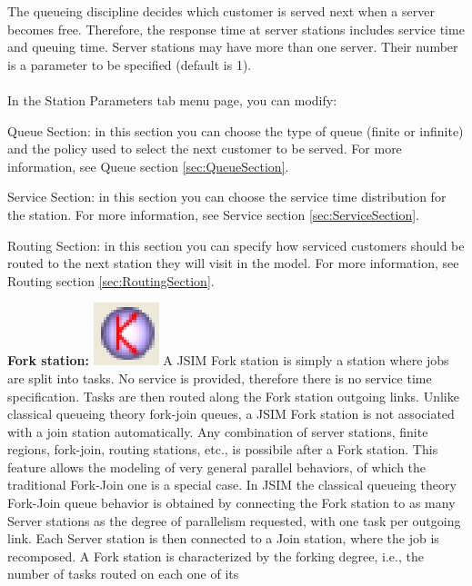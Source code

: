 \begin{enumerate*}
The queueing discipline decides which customer is served next when a server becomes free. Therefore, the response time at server stations includes service time and
queuing time. Server stations may have more than one server. Their number is a parameter to be specified (default is 1).\\\\
In the Station Parameters tab menu page, you can modify:
\begin{description*}
\item[Queue Section:]
in this section you can choose the type of queue (finite or infinite) and the policy used to select the next customer to be served.
For more information, see Queue section \autoref{sec:QueueSection}.
\item[Service Section:]
in this section you can choose the service time distribution for the station.
For more information, see Service section \autoref{sec:ServiceSection}.
\item[Routing Section:]
in this section you can specify how serviced customers should be routed to the next station they will visit in the model.
For more information, see Routing section \autoref{sec:RoutingSection}.
\end{description*}
\item \textbf{Fork station:}
\includegraphics[scale=0.5]{img/jsim/fork.eps} A JSIM Fork station
is simply a station where jobs are split into tasks. No service is
provided, therefore there is no service time specification. Tasks
are then routed along the Fork station outgoing links. Unlike
classical queueing theory fork-join queues, a JSIM Fork station is
not associated with a join station automatically. Any combination
of server stations, finite regions, fork-join, routing stations,
etc., is possibile after a Fork station. This feature allows the
modeling of very general parallel behaviors, of which the
traditional Fork-Join one is a special case. In JSIM the classical
queueing theory Fork-Join queue behavior is obtained by connecting
the Fork station to as many Server stations as the degree of
parallelism requested, with one task per outgoing link. Each
Server station is then connected to a Join station, where the job
is recomposed. A Fork station is characterized by the forking
degree, i.e., the number of tasks routed on each one of its

\end{enumerate*}
